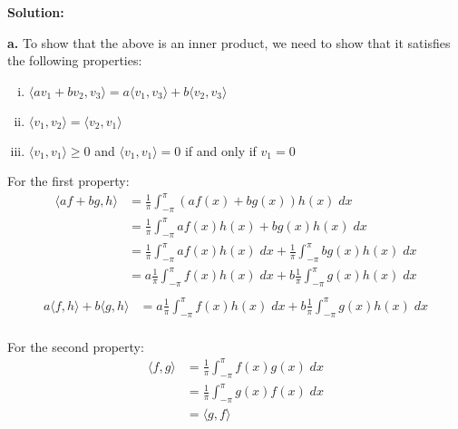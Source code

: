 \documentclass{article}
\begin{document}
\noindent\textbf{Solution:}

\vspace{0.25cm}
\noindent\textbf{a.} To show that the above is an inner product, we need to show that it satisfies the following properties:
\begin{enumerate}[i.]
    \item $\langle av_1 + bv_2, v_3 \rangle = a\langle v_1, v_3 \rangle + b\langle v_2, v_3 \rangle$
    \item $\langle v_1, v_2 \rangle = \langle v_2, v_1 \rangle$
    \item $\langle v_1, v_1 \rangle \geq 0$ and $\langle v_1, v_1 \rangle = 0$ if and only if $v_1 = 0$
\end{enumerate}

\noindent For the first property: \\
\begin{align*}
    \langle af + bg, h \rangle &= \frac{1}{\pi} \int_{-\pi}^{\pi} (af(x) + bg(x))h(x)\;dx \\
    &= \frac{1}{\pi} \int_{-\pi}^{\pi} af(x)h(x) + bg(x)h(x)\;dx \\
    &= \frac{1}{\pi} \int_{-\pi}^{\pi} af(x)h(x)\;dx + \frac{1}{\pi} \int_{-\pi}^{\pi} bg(x)h(x)\;dx \\
    &= a \frac{1}{\pi} \int_{-\pi}^{\pi} f(x)h(x)\;dx + b \frac{1}{\pi} \int_{-\pi}^{\pi} g(x)h(x)\;dx \\
\end{align*}
\begin{align*}
    a \langle f, h \rangle + b \langle g, h \rangle &= a \frac{1}{\pi} \int_{-\pi}^{\pi} f(x)h(x)\;dx + b \frac{1}{\pi} \int_{-\pi}^{\pi} g(x)h(x)\;dx \\
\end{align*}

\noindent For the second property: \\
\begin{align*}
    \langle f, g \rangle &= \frac{1}{\pi} \int_{-\pi}^{\pi} f(x)g(x)\;dx \\
    &= \frac{1}{\pi} \int_{-\pi}^{\pi} g(x)f(x)\;dx \\
    &= \langle g, f \rangle
\end{align*}
\end{document}
